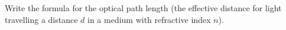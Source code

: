 

\vspace*{\fill}
\centering

Write the formula for the optical path length (the effective distance for light travelling a distance $d$ in a medium with refractive index $n$).

\centering
\vspace*{\fill}

